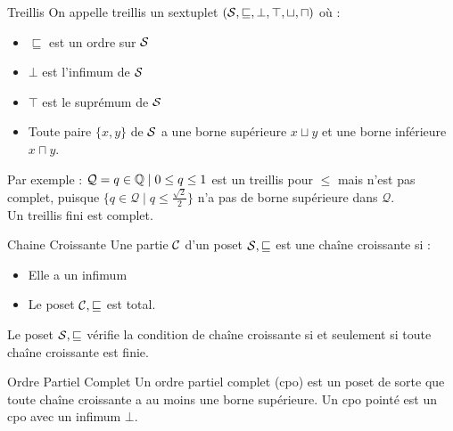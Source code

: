 \documentclass{cours}
\begin{document}
\begin{définition}{Treillis}{}
    On appelle treillis un sextuplet $\left(\mathcal{S}, \sqsubseteq, \bot, \top,\sqcup, \sqcap\right)$ où : 
    \begin{itemize}
        \item $\sqsubseteq$ est un ordre sur $\mathcal{S}$
        \item $\bot$ est l'infimum de $\mathcal{S}$
        \item $\top$ est le suprémum de $\mathcal{S}$
        \item Toute paire $\{x, y\}$ de $\mathcal{S}$ a une borne supérieure $x \sqcup y$ et une borne inférieure $x \sqcap y$.
    \end{itemize}
\end{définition}

Par exemple : $\mathcal{Q} = {q \in \mathbb{Q} \mid 0 \leq q \leq 1}$ est un treillis pour $\leq$ mais n'est pas complet, puisque $\{q \in \mathcal{Q} \mid q \leq \frac{\sqrt{2}}{2}\}$ n'a pas de borne supérieure dans $\mathcal{Q}$.\\
Un treillis fini est complet.
\begin{définition}{Chaine Croissante}{}
    Une partie $\mathcal{C}$ d'un poset $\mathcal{S}, \sqsubseteq$ est une chaîne croissante si : 
    \begin{itemize}
        \item Elle a un infimum
        \item Le poset $\mathcal{C}, \sqsubseteq$ est total.
    \end{itemize}
    Le poset $\mathcal{S}, \sqsubseteq$ vérifie la condition de chaîne croissante si et seulement si toute chaîne croissante est finie. 
\end{définition}

\begin{définition}{Ordre Partiel Complet}{}
    Un ordre partiel complet (cpo) est un poset de sorte que toute chaîne croissante a au moins une borne supérieure. Un cpo pointé est un cpo avec un infimum $\bot$.
\end{définition}
\end{document}
